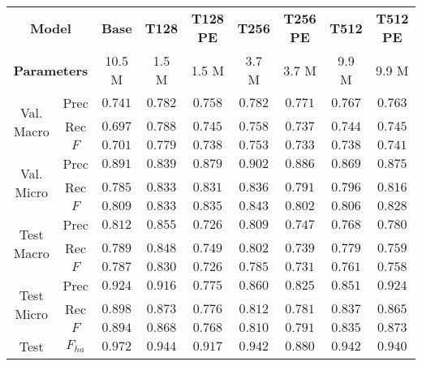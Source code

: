 \begin{tabular}{cc|ccccccc}
    \multicolumn{2}{c|}{\textbf{Model}} & \textbf{Base} & \textbf{T128} & \textbf{T128 PE} & \textbf{T256} & \textbf{T256 PE} & \textbf{T512} & \textbf{T512 PE}\\
    \multicolumn{2}{c|}{\textbf{Parameters}} & 10.5 M & 1.5 M & 1.5 M & 3.7 M & 3.7 M & 9.9 M & 9.9 M \\\hline
    \multirow{3}{*}{Val. Macro} & Prec     & $0.741$          & $\mathbf{0.782}$ & $0.758$ & $\mathbf{0.782}$ & $0.771$ & $0.767$ & $0.763$ \\
    & Rec      & $0.697$          & $\mathbf{0.788}$ & $0.745$ & $0.758$          & $0.737$ & $0.744$ & $0.745$          \\
    & $F$      & $0.701$          & $\mathbf{0.779}$ & $0.738$ & $0.753$          & $0.733$ & $0.738$ & $0.741$          \\\hline
    \multirow{3}{*}{Val. Micro} & Prec     & $0.891$          & $0.839$          & $0.879$ & $\mathbf{0.902}$ & $0.886$ & $0.869$ & $0.875$ \\
    & Rec      & $0.785$          & $0.833$          & $0.831$ & $\mathbf{0.836}$ & $0.791$ & $0.796$ & $0.816$          \\
    & $F$      & $0.809$          & $0.833$          & $0.835$ & $\mathbf{0.843}$ & $0.802$ & $0.806$ & $0.828$          \\\hline
    \multirow{3}{*}{Test Macro} & Prec     & $0.812$          & $\mathbf{0.855}$ & $0.726$ & $0.809$          & $0.747$ & $0.768$ & $0.780$ \\
    & Rec      & $0.789$          & $\mathbf{0.848}$ & $0.749$ & $0.802$          & $0.739$ & $0.779$ & $0.759$          \\
    & $F$      & $0.787$          & $\mathbf{0.830}$ & $0.726$ & $0.785$          & $0.731$ & $0.761$ & $0.758$          \\\hline
    \multirow{3}{*}{Test Micro} & Prec     & $\mathbf{0.924}$ & $0.916$          & $0.775$ & $0.860$          & $0.825$ & $0.851$ & $\mathbf{0.924}$ \\
    & Rec      & $\mathbf{0.898}$ & $0.873$          & $0.776$ & $0.812$          & $0.781$ & $0.837$ & $0.865$          \\
    & $F$      & $\mathbf{0.894}$ & $0.868$          & $0.768$ & $0.810$          & $0.791$ & $0.835$ & $0.873$          \\\hline
    \multirow{1}{*}{Test}       & $F_{ha}$ & $\mathbf{0.972}$ & $0.944$          & $0.917$ & $0.942$          & $0.880$ & $0.942$ & $0.940$ \\
\end{tabular}